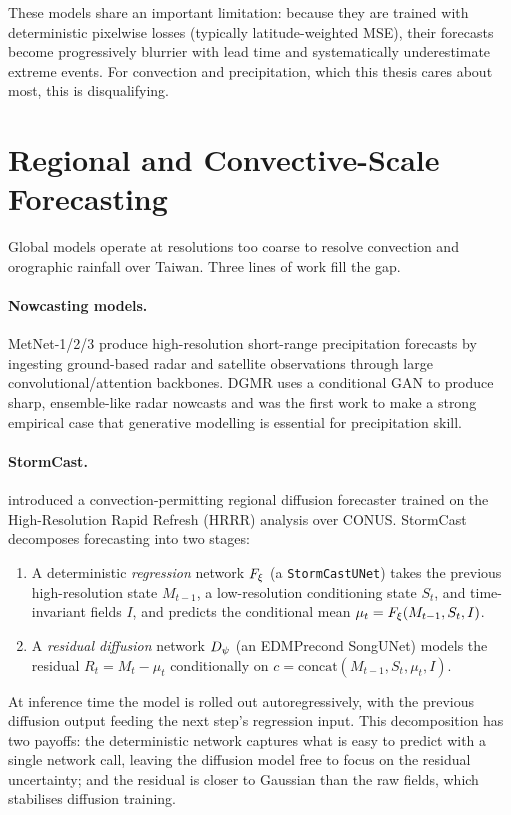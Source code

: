 These models share an important limitation: because they are trained with deterministic pixelwise losses (typically latitude-weighted MSE), their forecasts become progressively blurrier with lead time and systematically underestimate extreme events. For convection and precipitation, which this thesis cares about most, this is disqualifying.

\section{Regional and Convective-Scale Forecasting}
\label{sec:bg-regional}

Global models operate at resolutions too coarse to resolve convection and orographic rainfall over Taiwan. Three lines of work fill the gap.

\paragraph{Nowcasting models.} MetNet-1/2/3 \citep{sonderby2020metnet,espeholt2022metnet2,andrychowicz2023metnet3} produce high-resolution short-range precipitation forecasts by ingesting ground-based radar and satellite observations through large convolutional/attention backbones. DGMR \citep{ravuri2021dgmr} uses a conditional GAN to produce sharp, ensemble-like radar nowcasts and was the first work to make a strong empirical case that generative modelling is essential for precipitation skill.

\paragraph{StormCast.} \citet{pathak2024stormcast} introduced a convection-permitting regional diffusion forecaster trained on the High-Resolution Rapid Refresh (HRRR) analysis over CONUS. StormCast decomposes forecasting into two stages:
\begin{enumerate}
  \item A deterministic \emph{regression} network $F_{\xi}$ (a \texttt{StormCastUNet}) takes the previous high-resolution state $M_{t-1}$, a low-resolution conditioning state $S_t$, and time-invariant fields $I$, and predicts the conditional mean $\mu_t = F_{\xi}(M_{t-1}, S_t, I)$.
  \item A \emph{residual diffusion} network $D_{\psi}$ (an EDMPrecond SongUNet) models the residual $R_t = M_t - \mu_t$ conditionally on $c = \mathrm{concat}(M_{t-1}, S_t, \mu_t, I)$.
\end{enumerate}
At inference time the model is rolled out autoregressively, with the previous diffusion output feeding the next step's regression input. This decomposition has two payoffs: the deterministic network captures what is easy to predict with a single network call, leaving the diffusion model free to focus on the residual uncertainty; and the residual is closer to Gaussian than the raw fields, which stabilises diffusion training.

